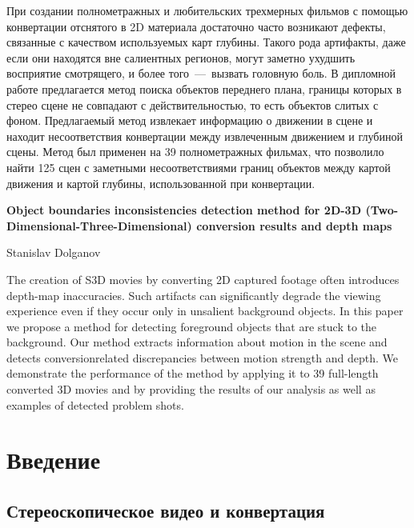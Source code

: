 \documentclass[14pt, a4paper]{extarticle}
\begin{document}
При создании полнометражных и любительских трехмерных фильмов с помощью 
конвертации отснятого в 2D материала достаточно часто возникают дефекты, 
связанные с качеством используемых карт глубины. Такого рода артифакты, 
даже если они находятся вне салиентных регионов,  могут заметно ухудшить 
восприятие смотрящего, и более того~---~вызвать головную боль. В дипломной
работе предлагается метод поиска объектов переднего плана, границы которых 
в стерео сцене не совпадают с действительностью, то есть объектов слитых 
с фоном. Предлагаемый метод извлекает информацию о движении в сцене и 
находит несоответствия конвертации между извлеченным движением и глубиной сцены.
Метод был применен на 39 полнометражных фильмах, что позволило найти 125 сцен с заметными несоответствиями границ объектов между картой движения и картой глубины, 
использованной при конвертации.

\vspace{2cm}

\textbf{Object boundaries inconsistencies detection method 
for 2D-3D (Two-Dimensional-Three-Dimensional)
conversion results and depth maps}

\vspace{0.5cm}
Stanislav Dolganov
\vspace{0.5cm}

The creation of S3D movies by converting 2D captured footage
often introduces depth-map inaccuracies. Such artifacts can
significantly degrade the viewing experience even if they occur
only in unsalient background objects.
In this paper we propose a method for detecting foreground
objects that are stuck to the background. Our method extracts
information about motion in the scene and detects conversionrelated
discrepancies between motion strength and depth. We
demonstrate the performance of the method by applying it
to 39 full-length converted 3D movies and by providing the
results of our analysis as well as examples of detected problem
shots.

\newpage
{}
\tableofcontents

\newpage
\section{Введение}

\subsection{Стереоскопическое видео и конвертация}
\end{document}
